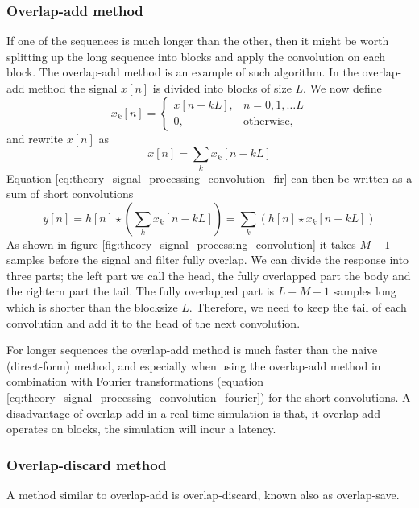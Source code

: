 \subsubsection{Overlap-add method}
If one of the sequences is much longer than the other, then it might be worth
splitting up the long sequence into blocks and apply the convolution on each
block. The overlap-add method is an example of such algorithm. In the
overlap-add method the signal $x[n]$ is divided into blocks of size $L$. We now
define
\begin{equation}
 x_k[n] =
 \begin{cases}
  x[n+kL], & n = 0,1,\dots L \\
  0, & \text{otherwise,}
 \end{cases}
\end{equation}
and rewrite $x[n]$ as
\begin{equation}
 x[n] = \sum_k x_k[n-kL]
\end{equation}
Equation \ref{eq:theory_signal_processing_convolution_fir} can then be written as a sum of short convolutions
\begin{equation}
y[n] = h[n] \star \left( \sum_k x_k[n-kL] \right) = \sum_k \left( h[n] \star x_k[n-kL] \right)
\end{equation}
As shown in figure \ref{fig:theory_signal_processing_convolution} it takes $M-1$
samples before the signal and filter fully overlap. We can divide the response
into three parts; the left part we call the head, the fully overlapped part the
body and the rightern part the tail. The fully overlapped part is $L-M+1$
samples long which is shorter than the blocksize $L$. Therefore, we need to keep
the tail of each convolution and add it to the head of the next convolution.

For longer sequences the overlap-add method is much faster than the naive
(direct-form) method, and especially when using the overlap-add method in
combination with Fourier transformations (equation
\ref{eq:theory_signal_processing_convolution_fourier}) for the short
convolutions. A disadvantage of overlap-add in a real-time simulation is that,
it overlap-add operates on blocks, the simulation will incur a latency.

\subsubsection{Overlap-discard method}
A method similar to overlap-add is overlap-discard, known also as overlap-save.
\todo{}


